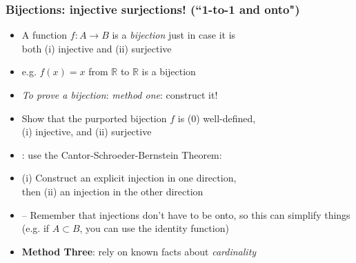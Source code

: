 \begin{frame}
\frametitle{Bijections: injective surjections! (``1-to-1 and onto")}

\begin{itemize}[<+->]

\item A function $f: A \rightarrow B$ is a \emph{bijection} just in case it is \\ both (i) injective and (ii) surjective

\item[] e.g. $f(x) = x$ from $\mathbb{R}$ to $\mathbb{R}$ is a bijection 

\item \emph{To prove a bijection}: \textit{method one}: construct it! 
\item[] Show that the purported bijection $f$ is (0) well-defined, \\ (i) injective, and (ii) surjective

\item {}: use the Cantor-Schroeder-Bernstein Theorem:
\item[] (i) Construct an explicit injection in one direction, \\ then (ii) an injection in the other direction
\item[] -- Remember that injections don't have to be onto, so this can simplify things (e.g. if $A \subset B$, you can use the identity function)

\item \textbf{Method Three}: rely on known facts about \textit{cardinality} 


\end{itemize}
\end{frame}

